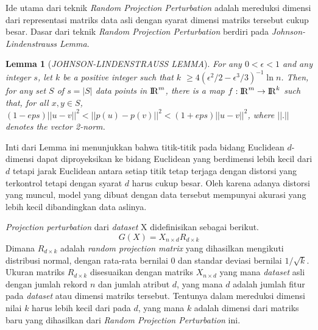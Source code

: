Ide utama dari teknik \textit{Random Projection Perturbation} adalah mereduksi dimensi dari representasi matriks data asli dengan syarat dimensi matriks tersebut cukup besar. Dasar dari teknik \textit{Random Projection Perturbation} berdiri pada \textit{Johnson-Lindenstrauss Lemma}.~\cite{lindestrauss:84:jllemma}
\newtheorem{theorem}{Lemma}
\begin{theorem}[\textit{JOHNSON-LINDENSTRAUSS LEMMA}]
	For any \(0 < \epsilon < 1\) and any integer \(s\), let \(k\) be a positive integer such that \(k\) \(\geq 4(\epsilon^{2}/2-\epsilon^{3}/3)^{-1}\ln{n}\). Then, for any set \(S\) of \(s = |S|\) data points in \({\rm I\!R}^{m}\), there is a map \(f : {\rm I\!R}^{m} \rightarrow {\rm I\!R}^{k}\) such that, for all \(x, y \in S\), \((1-eps)||u - v||^{2}<||p(u) - p(v)||^{2}<(1+eps)||u - v||^{2}\), where \(||.||\) denotes the vector 2-norm.
\end{theorem}
Inti dari Lemma ini menunjukkan bahwa titik-titik pada bidang Euclidean \(d\)-dimensi dapat diproyeksikan ke bidang Euclidean yang berdimensi lebih kecil dari \(d\) tetapi jarak Euclidean antara setiap titik tetap terjaga dengan distorsi yang terkontrol tetapi dengan syarat \(d\) harus cukup besar. Oleh karena adanya distorsi yang muncul, model yang dibuat dengan data tersebut mempunyai akurasi yang lebih kecil dibandingkan data aslinya.~\cite{kargupta:06:projection}

\textit{Projection perturbation} dari \textit{dataset} X didefinisikan sebagai berikut.
\begin{equation}
	G(X) = X_{n \times d} R_{d \times k}
\end{equation}
Dimana \(R_{d \times k}\) adalah \textit{random projection matrix} yang dihasilkan mengikuti distribusi normal, dengan rata-rata bernilai 0 dan standar deviasi bernilai \(1/\sqrt{k}\). Ukuran matriks \(R_{d \times k}\) disesuaikan dengan matriks \(X_{n \times d}\) yang mana \textit{dataset} asli dengan jumlah rekord \(n\) dan jumlah atribut \(d\), yang mana \(d\) adalah jumlah fitur pada \textit{dataset} atau dimensi matriks tersebut. Tentunya dalam mereduksi dimensi nilai \(k\) harus lebih kecil dari pada \(d\), yang mana \(k\) adalah dimensi dari matriks baru yang dihasilkan dari \textit{Random Projection Perturbation} ini.

